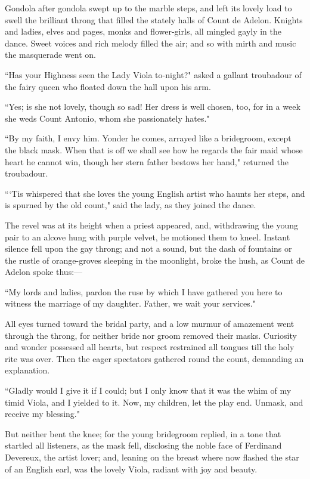 Gondola after gondola swept up to the marble steps, and left its lovely
load to swell the brilliant throng that filled the stately halls of
Count de Adelon. Knights and ladies, elves and pages, monks and
flower-girls, all mingled gayly in the dance. Sweet voices and rich
melody filled the air; and so with mirth and music the masquerade went
on.

``Has your Highness seen the Lady Viola to-night?" asked a gallant
troubadour of the fairy queen who floated down the hall upon his arm.

``Yes; is she not lovely, though so sad! Her dress is well chosen, too,
for in a week she weds Count Antonio, whom she passionately hates."

``By my faith, I envy him. Yonder he comes, arrayed like a bridegroom,
except the black mask. When that is off we shall see how he regards the
fair maid whose heart he cannot win, though her stern father bestows her
hand," returned the troubadour.

```Tis whispered that she loves the young English artist
who haunts her steps, and is spurned by the old count," said the lady,
as they joined the dance.

The revel was at its height when a priest appeared, and, withdrawing the
young pair to an alcove hung with purple velvet, he motioned them to
kneel. Instant silence fell upon the gay throng; and not a sound, but
the dash of fountains or the rustle of orange-groves sleeping in the
moonlight, broke the hush, as Count de Adelon spoke thus:---

``My lords and ladies, pardon the ruse by which I have gathered you here
to witness the marriage of my daughter. Father, we wait your services."

All eyes turned toward the bridal party, and a low murmur of amazement
went through the throng, for neither bride nor groom removed their
masks. Curiosity and wonder possessed all hearts, but respect restrained
all tongues till the holy rite was over. Then the eager spectators
gathered round the count, demanding an explanation.

``Gladly would I give it if I could; but I only know that it was the whim
of my timid Viola, and I yielded to it. Now, my children, let the play
end. Unmask, and receive my blessing."

But neither bent the knee; for the young bridegroom replied, in a tone
that startled all listeners, as the mask fell, disclosing the noble face
of Ferdinand Devereux, the artist lover; and, leaning on the breast
where now flashed the star of an English earl, was the lovely Viola,
radiant with joy and beauty.

